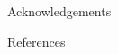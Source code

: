 \documentclass[22pt]{beamer}
\begin{document}
\begin{frame}[fragile]
\begin{textblock}{7.25}
\begin{block}{Acknowledgements}

\end{block}

\begin{block}{References}

{\scriptsize
}
\end{block}

\begin{comment}
\begin{block}{References}
\setbeamertemplate{bibliography item}{\insertbiblabel}

{\scriptsize
}
\end{block}
\vspace{-1.8mm}
\end{comment}
\end{textblock}


\end{frame}
\end{document}
